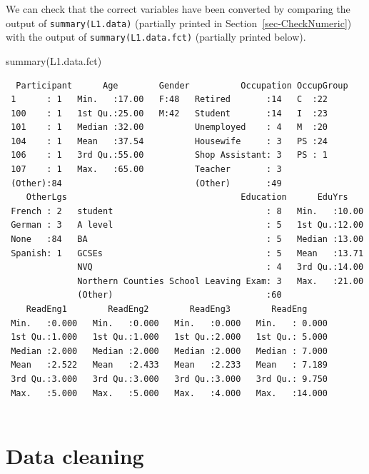 \documentclass[
  letterpaper,
  DIV=11,
  numbers=noendperiod]{scrreprt}
\newenvironment{Shaded}{\begin{snugshade}}{\end{snugshade}}
\newcommand{\FunctionTok}[1]{\textcolor[rgb]{0.28,0.35,0.67}{#1}}
\newcommand{\NormalTok}[1]{\textcolor[rgb]{0.00,0.23,0.31}{#1}}
\begin{document}
We can check that the correct variables have been converted by comparing
the output of \texttt{summary(L1.data)} (partially printed in
Section~\ref{sec-CheckNumeric}) with the output of
\texttt{summary(L1.data.fct)} (partially printed below).

\begin{Shaded}
\begin{Highlighting}[]
\FunctionTok{summary}\NormalTok{(L1.data.fct)}
\end{Highlighting}
\end{Shaded}

\begin{verbatim}
  Participant      Age        Gender          Occupation OccupGroup
 1      : 1   Min.   :17.00   F:48   Retired       :14   C  :22    
 100    : 1   1st Qu.:25.00   M:42   Student       :14   I  :23    
 101    : 1   Median :32.00          Unemployed    : 4   M  :20    
 104    : 1   Mean   :37.54          Housewife     : 3   PS :24    
 106    : 1   3rd Qu.:55.00          Shop Assistant: 3   PS : 1    
 107    : 1   Max.   :65.00          Teacher       : 3             
 (Other):84                          (Other)       :49             
    OtherLgs                                  Education      EduYrs     
 French : 2   student                              : 8   Min.   :10.00  
 German : 3   A level                              : 5   1st Qu.:12.00  
 None   :84   BA                                   : 5   Median :13.00  
 Spanish: 1   GCSEs                                : 5   Mean   :13.71  
              NVQ                                  : 4   3rd Qu.:14.00  
              Northern Counties School Leaving Exam: 3   Max.   :21.00  
              (Other)                              :60                  
    ReadEng1        ReadEng2        ReadEng3        ReadEng      
 Min.   :0.000   Min.   :0.000   Min.   :0.000   Min.   : 0.000  
 1st Qu.:1.000   1st Qu.:1.000   1st Qu.:2.000   1st Qu.: 5.000  
 Median :2.000   Median :2.000   Median :2.000   Median : 7.000  
 Mean   :2.522   Mean   :2.433   Mean   :2.233   Mean   : 7.189  
 3rd Qu.:3.000   3rd Qu.:3.000   3rd Qu.:3.000   3rd Qu.: 9.750  
 Max.   :5.000   Max.   :5.000   Max.   :4.000   Max.   :14.000  
                                                                 
\end{verbatim}

\section{\texorpdfstring{Data cleaning
}{Data cleaning }}\label{data-cleaning}
\end{document}
